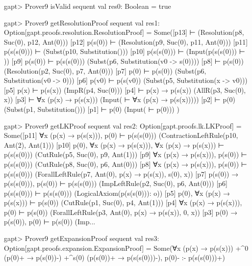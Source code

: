 \documentclass[a4paper,11pt]{book}
\begin{document}
\begin{clilisting}
gapt> Prover9 isValid sequent
  val res0: Boolean = true

gapt> Prover9 getResolutionProof sequent
  val res1: Option[gapt.proofs.resolution.ResolutionProof] =
  Some([p13]  ⊢    (Resolution(p8, Suc(0), p12, Ant(0)))
  [p12] p(s(0)) ⊢    (Resolution(p9, Suc(0), p11, Ant(0)))
  [p11] p(s(s(0))) ⊢    (Subst(p10, Substitution()))
  [p10] p(s(s(0))) ⊢    (Input(p(s(s(0))) ⊢ ))
  [p9] p(s(0)) ⊢ p(s(s(0)))   (Subst(p6, Substitution(v0 -> s(0))))
  [p8]  ⊢ p(s(0))   (Resolution(p2, Suc(0), p7, Ant(0)))
  [p7] p(0) ⊢ p(s(0))   (Subst(p6, Substitution(v0 -> 0)))
  [p6] p(v0) ⊢ p(s(v0))   (Subst(p5, Substitution(x -> v0)))
  [p5] p(x) ⊢ p(s(x))   (ImpR(p4, Suc(0)))
  [p4]  ⊢ p(x) → p(s(x))   (AllR(p3, Suc(0), x))
  [p3]  ⊢ ∀x (p(x) → p(s(x)))   (Input( ⊢ ∀x (p(x) → p(s(x)))))
  [p2]  ⊢ p(0)   (Subst(p1, Substitution()))
  [p1]  ⊢ p(0)   (Input( ⊢ p(0)))
  )

gapt> Prover9 getLKProof sequent
  val res2: Option[gapt.proofs.lk.LKProof] =
  Some([p11] ∀x (p(x) → p(s(x))), p(0) ⊢ p(s(s(0)))    (ContractionLeftRule(p10, Ant(2), Ant(1)))
  [p10] p(0), ∀x (p(x) → p(s(x))), ∀x (p(x) → p(s(x))) ⊢ p(s(s(0)))    (CutRule(p5, Suc(0), p9, Ant(1)))
  [p9] ∀x (p(x) → p(s(x))), p(s(0)) ⊢ p(s(s(0)))    (CutRule(p8, Suc(0), p6, Ant(0)))
  [p8] ∀x (p(x) → p(s(x))), p(s(0)) ⊢ p(s(s(0)))    (ForallLeftRule(p7, Ant(0), p(x) → p(s(x)), s(0), x))
  [p7] p(s(0)) → p(s(s(0))), p(s(0)) ⊢ p(s(s(0)))    (ImpLeftRule(p2, Suc(0), p6, Ant(0)))
  [p6] p(s(s(0))) ⊢ p(s(s(0)))    (LogicalAxiom(p(s(s(0))): o))
  [p5] p(0), ∀x (p(x) → p(s(x))) ⊢ p(s(0))    (CutRule(p1, Suc(0), p4, Ant(1)))
  [p4] ∀x (p(x) → p(s(x))), p(0) ⊢ p(s(0))    (ForallLeftRule(p3, Ant(0), p(x) → p(s(x)), 0, x))
  [p3] p(0) → p(s(0)), p(0) ⊢ p(s(0))    (Imp...

gapt> Prover9 getExpansionProof sequent
  val res3: Option[gapt.proofs.expansion.ExpansionProof] =
  Some(∀x (p(x) → p(s(x))) +^{0} (p(0)+ → p(s(0))-) +^{s(0)} (p(s(0))+ → p(s(s(0)))-),
  p(0)-
  :-
  p(s(s(0)))+)

\end{clilisting}
\end{document}
